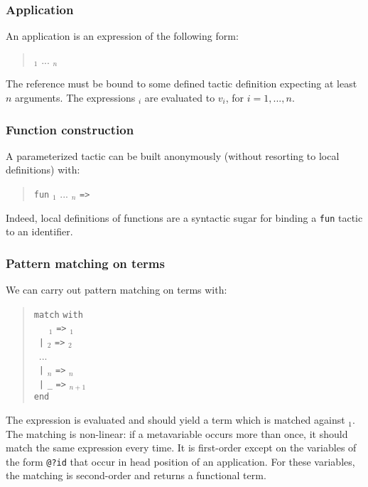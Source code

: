 \subsubsection{Application}

An application is an expression of the following form:
\begin{quote}
{\qualid} {\tacarg}$_1$ ... {\tacarg}$_n$
\end{quote}
The reference {\qualid} must be bound to some defined tactic
definition expecting at least $n$ arguments.  The expressions
{\tacexpr}$_i$ are evaluated to $v_i$, for $i=1,...,n$.


\subsubsection[Function construction]{Function construction
}

A parameterized tactic can be built anonymously (without resorting to
local definitions) with:
\begin{quote}
{\tt fun} {\ident${}_1$} ... {\ident${}_n$} {\tt =>} {\tacexpr}
\end{quote}
Indeed, local definitions of functions are a syntactic sugar for
binding a {\tt fun} tactic to an identifier.

\subsubsection[Pattern matching on terms]{Pattern matching on terms
}

We can carry out pattern matching on terms with:
\begin{quote}
{\tt match} {\tacexpr} {\tt with}\\
~~~{\cpattern}$_1$ {\tt =>} {\tacexpr}$_1$\\
~{\tt |} {\cpattern}$_2$ {\tt =>} {\tacexpr}$_2$\\
~...\\
~{\tt |} {\cpattern}$_n$ {\tt =>} {\tacexpr}$_n$\\
~{\tt |} {\tt \_} {\tt =>} {\tacexpr}$_{n+1}$\\
{\tt end}
\end{quote}
The expression {\tacexpr} is evaluated and should yield a term which
is matched against {\cpattern}$_1$. The matching is non-linear: if a
metavariable occurs more than once, it should match the same
expression every time. It is first-order except on the
variables of the form {\tt @?id} that occur in head position of an
application. For these variables, the matching is second-order and
returns a functional term.

